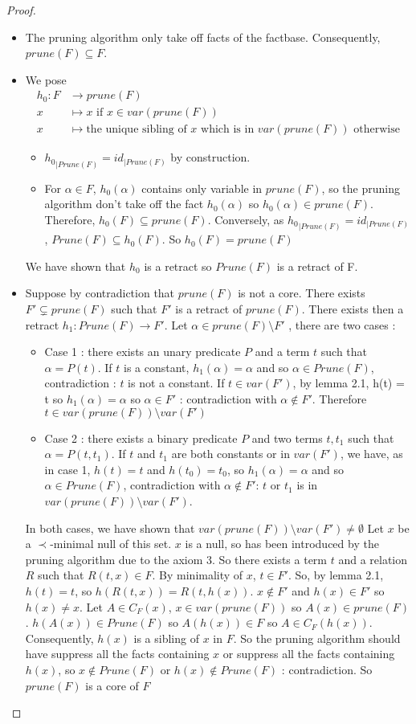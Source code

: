 \documentclass{article}
\theoremstyle{definition}
\theoremstyle{remark}
\begin{document}
\begin{proof}
\begin{itemize}
\item The pruning algorithm only take off facts of the factbase. Consequently, $prune(F) \subseteq F$.
\item We pose 
\begin{align*}
h_0:F &\to prune(F)\\
x &\mapsto x \text{ if }x \in var(prune(F))\\
x &\mapsto \text{the unique sibling of }x\text{ which is in } var(prune(F))\text{ otherwise}
\end{align*}
\begin{itemize}
\item ${h_0}_{|Prune(F)}=id_{|Prune(F)}$ by construction.
\item For $\alpha \in F$, $h_0(\alpha)$ contains only variable in $prune(F)$, so the pruning algorithm don't take off the fact $h_0(\alpha)$ so $h_0(\alpha) \in prune(F)$. Therefore, $h_0(F) \subseteq prune(F)$. Conversely, as ${h_0}_{|Prune(F)}=id_{|Prune(F)}$, $Prune(F) \subseteq h_0(F)$. So $h_0(F) = prune(F)$
\end{itemize}
We have shown that $h_0$ is a retract so $Prune(F)$ is a retract of F.
\item Suppose by contradiction that $prune(F)$ is not a core. There exists $F' \subsetneq prune(F)$ such that $F'$ is a retract of $prune(F)$. There exists then a retract $h_1: Prune(F) \to F'$.  Let $\alpha \in prune(F)\setminus F'$ , there are two cases :
\begin{itemize}
\item Case 1 : there exists an unary predicate $P$ and a term $t$ such that $\alpha = P(t)$. If $t$ is a constant, $h_1(\alpha) = \alpha$ and so $\alpha \in Prune(F)$, contradiction : $t$ is not a constant. If $t \in var(F')$, by lemma 2.1, h(t) = t so $h_1(\alpha) = \alpha$ so $\alpha \in F'$ : contradiction with $\alpha \notin F'$. Therefore $t \in var(prune(F))\setminus var(F')$
\item Case 2 : there exists a binary predicate $P$ and two terms $t,t_1$ such that $\alpha = P(t,t_1)$. If $t$ and $t_1$ are both constants or in $var(F')$, we have, as in case 1, $h(t) = t$ and $h(t_0) = t_0$, so $h_1(\alpha) = \alpha$ and so $\alpha \in Prune(F)$, contradiction with $\alpha \notin F'$: $t$ or $t_1$ is in $var(prune(F))\setminus var(F')$.
\end{itemize}
In both cases, we have shown that $var(prune(F))\setminus var(F') \neq \emptyset$ Let $x$ be a $\prec$-minimal null of this set. $x$ is a null, so has been introduced by the pruning algorithm due to the axiom 3. So there exists a term $t$ and a relation $R$ such that $R(t,x) \in F$. By minimality of $x$, $t \in F'$. So, by lemma 2.1, $h(t) = t$, so $h(R(t,x)) = R(t,h(x))$. $x \notin F'$ and $h(x) \in F'$ so $h(x) \neq x$. Let $A \in C_{F}(x)$, $x \in var(prune(F))$ so $A(x) \in prune(F)$. $h(A(x)) \in Prune(F)$ so $A(h(x)) \in F$ so $A \in C_F(h(x))$. Consequently, $h(x)$ is a sibling of $x$ in $F$. So the pruning algorithm should have suppress all the facts containing $x$ or suppress all the facts containing $h(x)$, so $x \notin Prune(F)$ or $h(x) \notin Prune(F)$ : contradiction. So $prune(F)$ is a core of $F$

\end{itemize}
\end{proof}
\end{document}
